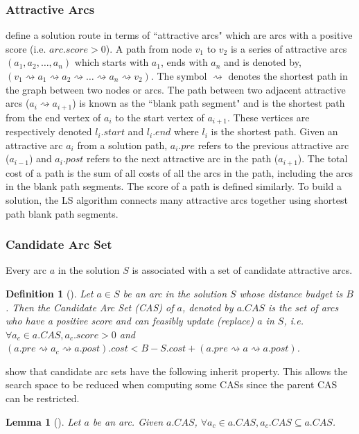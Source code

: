 \documentclass[honors]{union-cs-thesis}
\newtheorem{lemma}{Lemma}
\newtheorem{definition}{Definition}
\newcommand{\sse}{\subseteq} %
\newcommand{\spa}{\rightsquigarrow}
\begin{document}
\subsubsection{Attractive Arcs}
\citeauthor{lu2015arc} define a solution route in terms of ``attractive arcs" which are arcs with a positive score (i.e. $arc.score > 0$). A path from node $v_1$ to $v_2$ is a series of attractive arcs $(a_1, a_2, \ldots, a_n)$ which starts with $a_1$, ends with $a_n$ and is denoted by, $(v_1 \spa a_1 \spa a_2 \spa \ldots \spa a_n \spa v_2)$. The symbol $\spa$ denotes the shortest path in the graph between two nodes or arcs. The path between two adjacent attractive arcs ($a_i \spa  a_{i+1}$) is known as the ``blank path segment" and is the shortest path from the end vertex of $a_i$ to the start vertex of $a_{i+1}$. These vertices are respectively denoted $l_i.start$ and $l_i.end$ where $l_i$ is the shortest path. Given an attractive arc $a_i$ from a solution path, $a_i.pre$ refers to the previous attractive arc ($a_{i-1}$) and $a_i.post$ refers to the next attractive arc in the path ($a_{i+1}$). The total cost of a path is the sum of all costs of all the arcs in the path, including the arcs in the blank path segments. The score of a path is defined similarly. To build a solution, the LS algorithm connects many attractive arcs together using shortest path blank path segments.

\subsubsection{Candidate Arc Set}
Every arc $a$ in the solution $S$ is associated with a set of candidate attractive arcs. 
%
%
\begin{definition}[\cite{lu2015arc}]
    Let $a \in S$ be an arc in the solution $S$ whose distance budget is $B$. Then the Candidate Arc Set (CAS) of $a$, denoted by $a.CAS$ is the set of arcs who have a positive score and can feasibly update (replace) $a$ in $S$, i.e. $\forall a_c \in a.CAS, a_c.score > 0$ and $(a.pre \spa a_c \spa a.post).cost < B - S.cost + (a.pre \spa a \spa a.post)$.
\end{definition}

\citeauthor{lu2015arc} show that candidate arc sets have the following inherit property. This allows the search space to be reduced when computing some CASs since the parent CAS can be restricted.
\begin{lemma}[\cite{lu2015arc}] Let $a$ be an arc. Given $a.CAS$, $\forall a_c \in a.CAS, a_c.CAS \sse a.CAS$.
\end{lemma}
\end{document}
